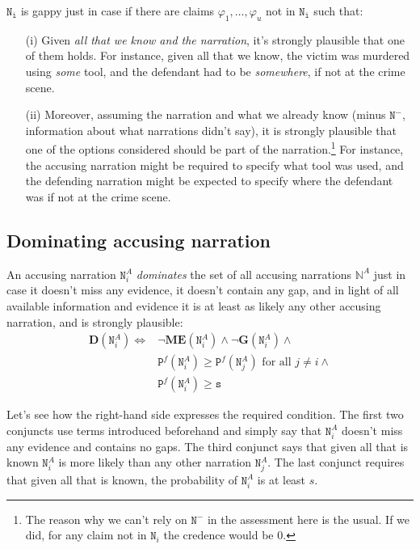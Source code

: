 \documentclass[10pt,leqno]{article}
\newcommand{\n}{\neg}
\newcommand{\et}{\wedge}
\begin{document}
$\mathtt{N_i}$ is gappy just in case if there are claims $\varphi_1,\dots, \varphi_u$ not in $\mathtt{N_i}$ such that:

\begin{itemize}
\item[(i)] Given \emph{all that we know and the narration}, it's strongly plausible that one of them holds. For instance, given all that we know, the victim was murdered using \emph{some} tool, and the defendant had to be \emph{somewhere}, if not at the crime scene.
\item[(ii)] Moreover, assuming  the narration  and what we already know (minus $\mathtt{N}^-$, information about what narrations didn't say), it is strongly plausible that one of the options considered should be part of the narration.\footnote{The reason why we can't rely on $\mathtt{N}^-$ in the assessment here is the usual. If we did, for any claim not in $\mathtt{N}_i$  the credence would be 0.} For instance, the accusing narration might be required to specify what tool was used, and the defending narration might be expected to specify where the defendant was if not at the crime scene.
\end{itemize}





\subsection{Dominating accusing narration}

An accusing narration $\mathtt{N}^A_i$ \emph{dominates} the set of all accusing narrations $\mathbb{N}^A$ just in case it doesn't miss any evidence, it doesn't contain any gap, and in light of all available information and evidence  it is at least as likely any  other accusing narration, and is strongly plausible:
\begin{align}
\tag{Domination}
\label{Domination}
\mathbf{D}(\mathtt{N}^A_i) \Leftrightarrow  & \n \mathbf{ME}(\mathtt{N}^A_i) \et \n \mathbf{G}(\mathtt{N}^A_i) \et \\ \nonumber
& \mathtt{P}^f( \mathtt{N}^A_i)\geq \mathtt{P}^f( \mathtt{N}^A_j ) \mbox{ for all } j \neq i \et\\  \nonumber 
& \mathtt{P}^f(\mathtt{N}^A_i) \geq \mathtt{s}
\end{align} 


Let's see how the right-hand side expresses the required condition. The first two conjuncts use terms introduced beforehand and simply say that $\mathtt{N}^A_i$ doesn't miss any evidence and contains no gaps. The third conjunct says that given all that is known $\mathtt{N}^A_i$ is more likely than any other narration $\mathtt{N}^A_j$. The last conjunct requires that given all that is known, the probability of $\mathtt{N}^A_i$ is at least $s$.
\end{document}
